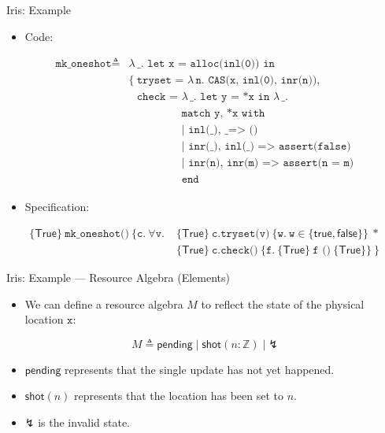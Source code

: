 \documentclass{beamer}
\newcommand{\true}{\mathsf{true}}
\newcommand{\false}{\mathsf{false}}
\newcommand{\pending}{\mathsf{pending}}
\newcommand{\shot}{\mathsf{shot}}
\newcommand{\invalid}{\mathord{\lightning}}
\begin{document}
\begin{frame}{Iris: Example}
  \small
  \begin{itemize}
    \item Code:
  \end{itemize}
  \[
  \begin{aligned}
    \texttt{mk\_oneshot} \triangleq{}& \lambda\,\texttt{\_. let x = alloc(inl(0)) in} \\
      &\{\ \texttt{tryset = }\lambda\,\texttt{n. CAS(x, inl(0), inr(n)),} \\
      &\phantom{\{}\ \texttt{check = }\lambda\,\texttt{\_. let y = *x in }\lambda\,\texttt{\_.} \\
      &\phantom{\{\ \texttt{check = }}\texttt{match y, *x with} \\
      &\phantom{\{\ \texttt{check = }}\texttt{| inl(\_), \_ => ()} \\
      &\phantom{\{\ \texttt{check = }}\texttt{| inr(\_), inl(\_) => assert(false)} \\
      &\phantom{\{\ \texttt{check = }}\texttt{| inr(n), inr(m) => assert(n = m)} \\
      &\phantom{\{\ \texttt{check = }}\texttt{end}
  \end{aligned}
  \]
  \begin{itemize}
    \item Specification:
  \end{itemize}
  \[
  \begin{aligned}
    \{\mathsf{True}\}\ \texttt{mk\_oneshot()}\
    \{\texttt{c}.\ \forall\texttt{v}.\;&
      \{\mathsf{True}\}\ \texttt{c.tryset(v)}\
        \{\texttt{w}.\ \texttt{w}\in\{\true,\false\}\}\ \ast \\
      &\{\mathsf{True}\}\ \texttt{c.check()}\
        \{\texttt{f}.\ \{\mathsf{True}\}\ \texttt{f ()}\ \{\mathsf{True}\}\}\ \}
  \end{aligned}
  \]
\end{frame}

\begin{frame}{Iris: Example --- Resource Algebra (Elements)}
  \begin{itemize}
    \item We can define a resource algebra $M$ to reflect the state of the
      physical location $\texttt{x}$:
  \end{itemize}
  \[
    M \triangleq \pending \mid \shot(n:\mathbb{Z}) \mid \invalid
  \]
  \begin{itemize}
    \item $\pending$ represents that the single update has not yet happened.
    \item $\shot(n)$ represents that the location has been set to $n$.
    \item $\invalid$ is the invalid state.
  \end{itemize}
\end{frame}
\end{document}
